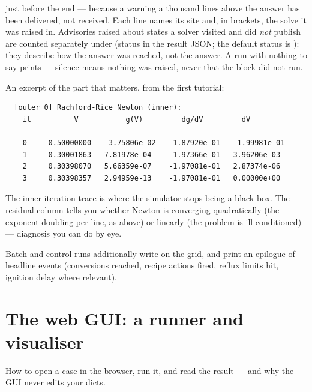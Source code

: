 \documentclass[11pt,a4paper]{article}
\begin{document}
\begin{enumerate}[leftmargin=*]
         just before the end --- because a
        warning a thousand lines above the answer has been delivered, not
        received.  Each line names its site and, in brackets, the solve it
        was raised in.  Advisories raised about states a solver visited and
        did \emph{not} publish are counted separately under  (status  in the result JSON; the
        default status is ): they describe how the answer
        was reached, not the answer.  A run with nothing to say prints
         --- silence means nothing was
        raised, never that the block did not run.
\end{enumerate}

An excerpt of the part that matters, from the first tutorial:

\begin{lstlisting}
  [outer 0] Rachford-Rice Newton (inner):
    it          V           g(V)         dg/dV         dV
    ----  -----------  -------------  -------------  -------------
    0     0.50000000   -3.75806e-02   -1.87920e-01   -1.99981e-01
    1     0.30001863   7.81978e-04    -1.97366e-01   3.96206e-03
    2     0.30398070   5.66359e-07    -1.97081e-01   2.87374e-06
    3     0.30398357   2.94959e-13    -1.97081e-01   0.00000e+00
\end{lstlisting}

\begin{keyidea}
The inner iteration trace is where the simulator stops being a black
box.  The residual column tells you whether Newton is converging
quadratically (the exponent doubling per line, as above) or linearly
(the problem is ill-conditioned) --- diagnosis you can do by eye.
\end{keyidea}

Batch and control runs additionally write  on the
 grid, and print an epilogue of headline events
(conversions reached, recipe actions fired, reflux limits hit,
ignition delay where relevant).

\section{The web GUI: a runner and visualiser}\label{sec:gui}

\begin{whatyoulllearn}
How to open a case in the browser, run it, and read the result --- and
why the GUI never edits your dicts.
\end{whatyoulllearn}
\end{document}

